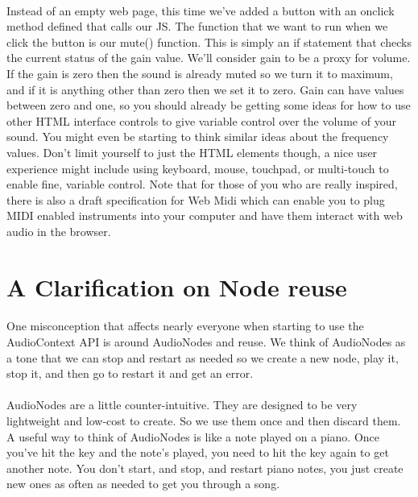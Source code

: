 \paragraph{} Instead of an empty web page, this time we've added a button with an onclick method defined that calls our JS. The function that we want to run when we click the button is our mute() function. This is simply an if statement that checks the current status of the gain value. We'll consider gain to be a proxy for volume. If the gain is zero then the sound is already muted so we turn it to maximum, and if it is anything other than zero then we set it to zero. Gain can have values between zero and one, so you should already be getting some ideas for how to use other HTML interface controls to give variable control over the volume of your sound. You might even be starting to think similar ideas about the frequency values. Don't limit yourself to just the HTML elements though, a nice user experience might include using keyboard, mouse, touchpad, or multi-touch to enable fine, variable control. Note that for those of you who are really inspired, there is also a draft specification for Web Midi which can enable you to plug MIDI enabled instruments into your computer and have them interact with web audio in the browser.

\section{A Clarification on Node reuse}
\paragraph{} One misconception that affects nearly everyone when starting to use the AudioContext API is around AudioNodes and reuse. We think of AudioNodes as a tone that we can stop and restart as needed so we create a new node, play it, stop it, and then go to restart it and get an error.
\paragraph{} AudioNodes are a little counter-intuitive. They are designed to be very lightweight and low-cost to create. So we use them once and then discard them. A useful way to think of AudioNodes is like a note played on a piano. Once you’ve hit the key and the note’s played, you need to hit the key again to get another note. You don't start, and stop, and restart piano notes, you just create new ones as often as needed to get you through a song. 

